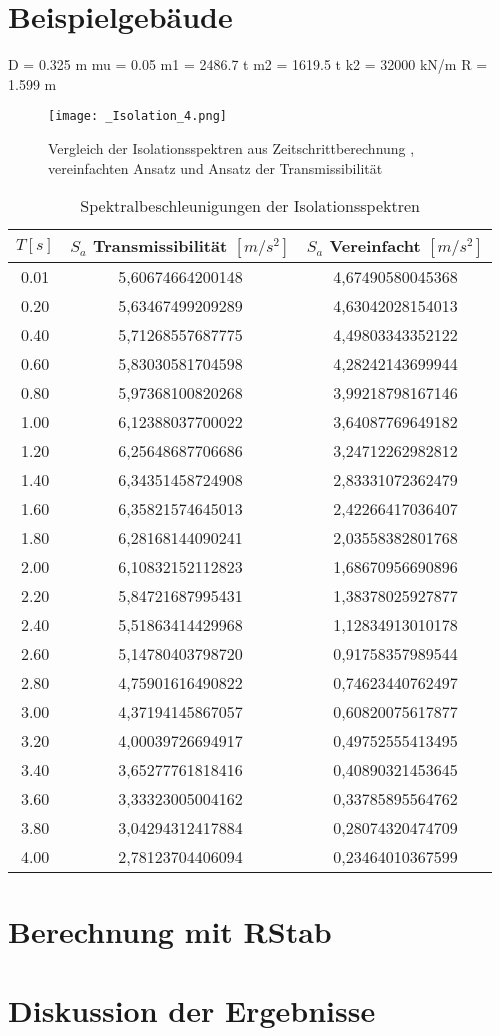 \section{Beispielgebäude}
\label{sec:besipielgebaude}

D = 0.325 m
mu = 0.05
m1 = 2486.7 t
m2 = 1619.5 t
k2 = 32000 kN/m
R = 1.599 m

\begin{figure}[H]
    \centering
    \texttt{[image: \_Isolation\_4.png]}
    \caption{Vergleich der Isolationsspektren aus Zeitschrittberechnung \cite{Isemann}, vereinfachten Ansatz und Ansatz der Transmissibilität}
    \label{fig:Isolation2}
\end{figure}


\begin{table}[H]
\centering
\begin{tabular}{ |c|c|c| } 
 \hline
 $T [s]$ & $S_a$ Transmissibilität $[m/s^2]$ & $S_a$ Vereinfacht $[m/s^2]$\\
 \hline\hline
0.01 & 5,60674664200148 & 4,67490580045368\\
0.20 & 5,63467499209289 & 4,63042028154013\\
0.40 & 5,71268557687775 & 4,49803343352122\\
0.60 & 5,83030581704598 & 4,28242143699944\\
0.80 & 5,97368100820268 & 3,99218798167146\\
1.00 & 6,12388037700022 & 3,64087769649182\\
1.20 & 6,25648687706686 & 3,24712262982812\\
1.40 & 6,34351458724908 & 2,83331072362479\\
1.60 & 6,35821574645013 & 2,42266417036407\\
1.80 & 6,28168144090241 & 2,03558382801768\\
2.00 & 6,10832152112823 & 1,68670956690896\\
2.20 & 5,84721687995431 & 1,38378025927877\\
2.40 & 5,51863414429968 & 1,12834913010178\\
2.60 & 5,14780403798720 & 0,91758357989544\\
2.80 & 4,75901616490822 & 0,74623440762497\\
3.00 & 4,37194145867057 & 0,60820075617877\\
3.20 & 4,00039726694917 & 0,49752555413495\\
3.40 & 3,65277761818416 & 0,40890321453645\\
3.60 & 3,33323005004162 & 0,33785895564762\\
3.80 & 3,04294312417884 & 0,28074320474709\\
4.00 & 2,78123704406094 & 0,23464010367599\\
 \hline
\end{tabular}
\caption{Spektralbeschleunigungen der Isolationsspektren}
\end{table}


\pagebreak

\section{Berechnung mit RStab}
\label{sec:rstab}

\pagebreak

\section{Diskussion der Ergebnisse}
\label{sec:diskussion}

\pagebreak